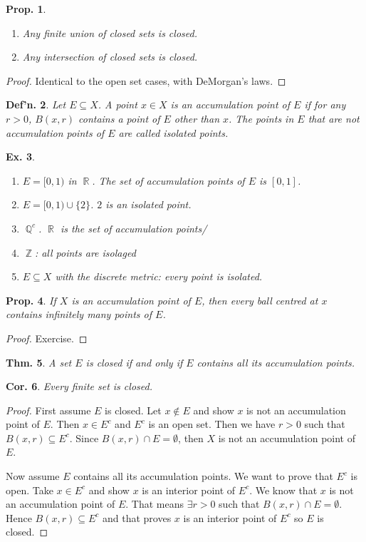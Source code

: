 \documentclass[12pt, a4paper]{book}
\DeclareMathOperator{\Q}{\mathbb{Q}}
\DeclareMathOperator{\Z}{\mathbb{Z}}
\DeclareMathOperator{\R}{\mathbb{R}}
\newtheorem{theorem}{Thm.}[section]
\newtheorem{definition}[theorem]{Def'n.}
\newtheorem{corollary}[theorem]{Cor.}
\newtheorem{proposition}[theorem]{Prop.}
\newtheorem{example}[theorem]{Ex.}
\theoremstyle{nonumberplain}
\newtheorem{proof}{Proof}
\begin{document}
\begin{proposition} \hspace{1cm}
    \begin{enumerate}
        \item Any finite union of closed sets is closed.
        \item Any intersection of closed sets is closed.
    \end{enumerate}
\end{proposition}
\begin{proof}
    Identical to the open set cases, with DeMorgan's laws.
\end{proof}
\begin{definition}
    Let $E\subseteq X$. A point $x\in X$ is an \textit{accumulation point} of $E$ if for any $r>0$, $B(x,r)$ contains a point
    of $E$ other than $x$. The points in $E$ that are not accumulation points of $E$ are called \textit{isolated points}.
\end{definition}
\begin{example}
    \begin{enumerate}
        \item $E=[0,1)$ in $\R$. The set of accumulation points of $E$ is $[0,1]$.
        \item $E=[0,1)\cup\{2\}$. $2$ is an isolated point.
        \item $\Q^c$. $\R$ is the set of accumulation points/
        \item $\Z$: all points are isolaged
        \item $E\subseteq X$ with the discrete metric: every point is isolated.
    \end{enumerate}
\end{example}
\begin{proposition}
    If $X$ is an accumulation point of $E$, then every ball centred at $x$ contains infinitely many points of $E$.
\end{proposition}
\begin{proof}
    Exercise.
\end{proof}
\begin{theorem}
    A set $E$ is closed if and only if $E$ contains all its accumulation points.
\end{theorem}
\begin{corollary}
    Every finite set is closed.
\end{corollary}
\begin{proof}
    First assume $E$ is closed. Let $x\notin E$ and show $x$ is not an accumulation point of $E$. Then $x\in E^c$ and
    $E^c$ is an open set. Then we have $r>0$ such that $B(x,r)\subseteq E^c$. Since $B(x,r)\cap E=\emptyset$, then $X$
    is not an accumulation point of $E$.

    Now assume $E$ contains all its accumulation points. We want to prove that $E^c$ is open. Take $x\in E^c$ and show
    $x$ is an interior point of $E^c$. We know that $x$ is not an accumulation point of $E$. That means $\exists r>0$ such that
    $B(x,r)\cap E=\emptyset$. Hence $B(x,r)\subseteq E^c$ and that proves $x$ is an interior point of $E^c$ so $E$ is closed.
\end{proof}
\end{document}

